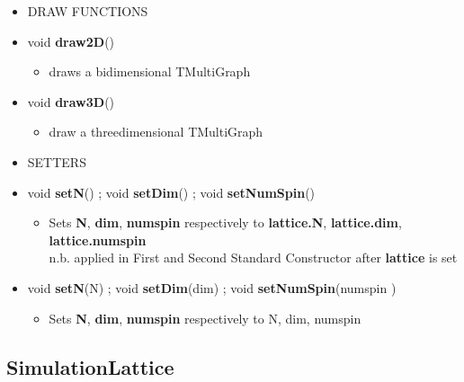 \begin{itemize}
\begin{itemize}
		\item[] DRAW FUNCTIONS
			\item[] void \textbf{draw2D}()
			\begin{itemize}
				\item[] draws a bidimensional TMultiGraph
			\end{itemize}

			\item[] void \textbf{draw3D}()
			\begin{itemize}
				\item[] draw a threedimensional TMultiGraph
			\end{itemize}

		\item[] SETTERS

			\item[] void \textbf{setN}() ; void \textbf{setDim}() ; void \textbf{setNumSpin}()
			\begin{itemize}
				\item[]
						{\small
						 Sets \textbf{N}, \textbf{dim}, \textbf{num\textunderscore spin} respectively to
						\textbf{lattice.N}, \textbf{lattice.dim}, \textbf{lattice.num\textunderscore spin}
						\\
						\textsf{n.b.}
						applied in First and Second Standard Constructor after \textbf{lattice} is set
						}
			\end{itemize}

			\item[] void \textbf{setN}(\textunderscore N) ;
					void \textbf{setDim}(\textunderscore dim) ;
					void \textbf{setNumSpin}(\textunderscore num\textunderscore spin )
			\begin{itemize}
				\item[] Sets \textbf{N}, \textbf{dim}, \textbf{num\textunderscore spin} respectively to
						\textunderscore N, \textunderscore dim, \textunderscore num\textunderscore spin
			\end{itemize}

	\end{itemize}


\end{itemize}

\newpage


\subsection*{SimulationLattice}

